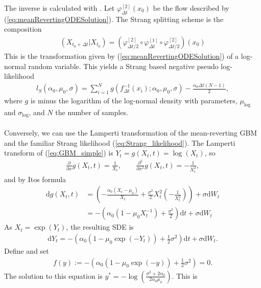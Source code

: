 The inverse is calculated with \cite[remark belown equation (9)]{SplittingSchemes}. Let $\varphi_{\Delta t}^{[2]}(x_0)$ be the flow described by (\ref{eq:meanRevertingODESolution}).
The Strang splitting scheme is the composition
\begin{align}
    \left(X_{t_0 + \Delta t} | X_{t_0}\right) = \left(\varphi_{\Delta t / 2}^{[2]}\circ \varphi_{\Delta t}^{[1]} \circ \varphi_{\Delta t / 2}^{[2]}\right)(x_0)
\end{align}
This is the transformation given by (\ref{eq:meanRevertingODESolution}) of a log-normal random variable. This yields a Strang based negative pseudo log-likelihood
\begin{align}
    l_S(\alpha_0, \mu_0, \sigma) = \sum_{i = 1}^{N} g(f_{\Delta t}^{-1}(x_i); \alpha_0,\mu_0, \sigma) - \frac{\alpha_0\Delta t(N - 1)}{2},
\end{align}
where $g$ is minus the logarithm of the log-normal density with parameters, $\mu_{\mathrm{log}}$ and $\sigma_{\mathrm{log}}$, and $N$ the number of samples.\\\\
Conversely, we can use the Lamperti transformation of the mean-reverting GBM and the familiar Strang likelihood (\ref{eq:Strang_likelihood}). The Lamperti transform of (\ref{eq:GBM_simple}) is $Y_t = g(X_t, t) = \log(X_t)$, so
\begin{align}
    \frac{\partial}{\partial x}g(X_t, t) = \frac{1}{X_t}, \qquad \frac{\partial^2}{\partial x^2}g(X_t, t) = -\frac{1}{X_t^2},
\end{align}
and by Itos formula
\begin{align}
    \mathrm{d}g(X_t, t) &= \left(-\frac{\alpha_0\left(X_t - \mu_0\right)}{X_t}+\frac{\sigma^2}{2}X_t^2\left(-\frac{1}{X_t^2}\right)\right) + \sigma\mathrm{d}W_t\nonumber\\
    &= -\left(\alpha_0\left(1-\mu_0X_t^{-1}\right) + \frac{\sigma^2}{2}\right)\mathrm{d}t + \sigma\mathrm{d}W_t
\end{align}
As $X_t = \exp(Y_t)$, the resulting SDE is
\begin{align}
    \mathrm{d}Y_t = -\left(\alpha_0\left(1 - \mu_0\exp(-Y_t)\right) + \frac{1}{2}\sigma^2\right)\mathrm{d}t + \sigma \mathrm{d}W_t. \label{eq:GBM_lamperti}
\end{align}
Define and set
\begin{align}
    f(y) := -\left(\alpha_0\left(1 - \mu_0\exp(-y)\right) + \frac{1}{2}\sigma^2\right) = 0.
\end{align}
The solution to this equation is $y^* = -\log\left(\frac{\sigma^2 + 2\alpha_0}{2\alpha_0\mu_0}\right)$. This is
